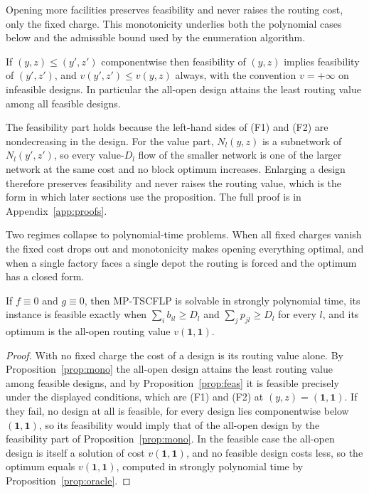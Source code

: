 Opening more facilities preserves feasibility and never raises the
routing cost, only the fixed charge. This monotonicity underlies both the polynomial
cases below and the admissible bound used by the enumeration algorithm.

\begin{proposition}[monotonicity]\label{prop:mono}
If $(y,z)\le(y',z')$ componentwise then feasibility of $(y,z)$ implies
feasibility of $(y',z')$, and $v(y',z')\le v(y,z)$ always, with the
convention $v=+\infty$ on infeasible designs. In particular the all-open
design attains the least routing value among all feasible designs.
\end{proposition}
The feasibility part holds because the left-hand sides of (F1) and
(F2) are nondecreasing in the design. For the value part, $N_l(y,z)$ is
a subnetwork of $N_l(y',z')$, so every value-$D_l$ flow of the smaller
network is one of the larger network at the same cost and no block
optimum increases. Enlarging a design therefore preserves feasibility
and never raises the routing value, which is the form in which later
sections use the proposition. The full proof is in Appendix~\ref{app:proofs}.

Two regimes collapse to polynomial-time problems. When all fixed charges
vanish the fixed cost drops out and monotonicity makes opening everything
optimal, and when a single factory faces a single depot the routing is
forced and the optimum has a closed form.

\begin{proposition}\label{prop:fzero}
If $f\equiv 0$ and $g\equiv 0$, then MP-TSCFLP is solvable in strongly
polynomial time, its instance is feasible exactly when
$\sum_i b_{il}\ge D_l$ and $\sum_j p_{jl}\ge D_l$ for every $l$, and its
optimum is the all-open routing value $v(\mathbf 1,\mathbf 1)$.
\end{proposition}
\begin{proof}
With no fixed charge the cost of a design is its routing
value alone. By Proposition~\ref{prop:mono} the all-open design attains
the least routing value among feasible designs, and by
Proposition~\ref{prop:feas} it is feasible precisely under the displayed
conditions, which are (F1) and (F2) at $(y,z)=(\mathbf 1,\mathbf 1)$. If
they fail, no design at all is feasible, for every design lies
componentwise below $(\mathbf 1,\mathbf 1)$, so its feasibility would
imply that of the all-open design by the feasibility part of
Proposition~\ref{prop:mono}. In the feasible case the all-open design is
itself a solution of cost $v(\mathbf 1,\mathbf 1)$, and no feasible
design costs less, so the optimum equals $v(\mathbf 1,\mathbf 1)$,
computed in strongly polynomial time by Proposition~\ref{prop:oracle}.
\end{proof}

